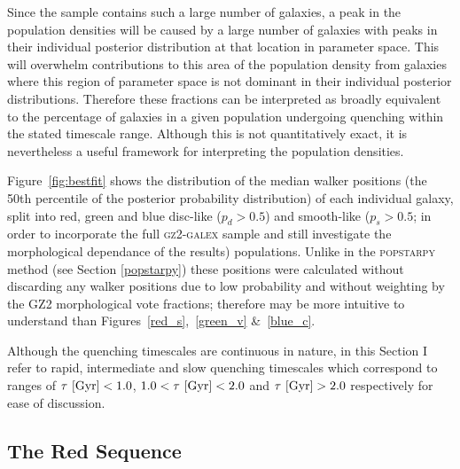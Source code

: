 Since the sample contains such a large number of galaxies, a peak in the population densities will be caused by a large number of galaxies with peaks in their individual posterior distribution at that location in parameter space. This will overwhelm contributions to this area of the population density from galaxies where this region of parameter space is not dominant in their individual posterior distributions. Therefore these fractions can be interpreted as broadly equivalent to the percentage of galaxies in a given population undergoing quenching within the stated timescale range. Although this is not quantitatively exact, it is nevertheless a useful framework for interpreting the population densities.

Figure~\ref{fig:bestfit} shows the distribution of the median walker positions (the 50th percentile of the posterior probability distribution) of each individual galaxy, split into red, green and blue disc-like ($p_d > 0.5$) and smooth-like ($p_s > 0.5$; in order to incorporate the full \textsc{gz2-galex} sample and still investigate the morphological dependance of the results) populations. Unlike in the \textsc{popstarpy} method (see Section \ref{popstarpy}) these positions were calculated without discarding any walker positions due to low probability and without weighting by the GZ2 morphological vote fractions; therefore may be more intuitive to understand than Figures~\ref{red_s},~\ref{green_v} \&~\ref{blue_c}.

Although the quenching timescales are continuous in nature, in this Section I refer to rapid, intermediate and slow quenching timescales which correspond to ranges of  $\tau ~\rm{[Gyr]} < 1.0$, $1.0 < \tau ~\rm{[Gyr]} < 2.0$ and $\tau ~\rm{[Gyr]} > 2.0$ respectively for ease of discussion.



\subsection{The Red Sequence}\label{rs}

